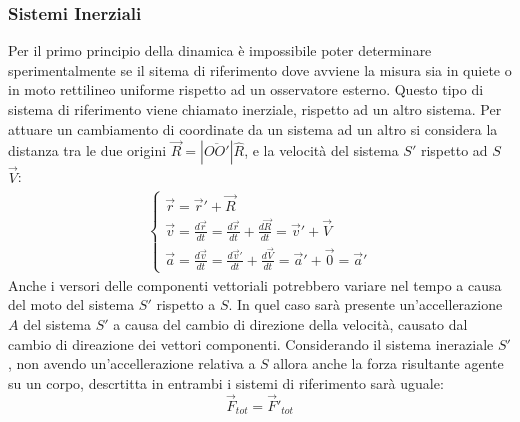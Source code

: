 \documentclass{article}
\numberwithin{equation}{subsection}
\begin{document}
\subsubsection{Sistemi Inerziali}
Per il primo principio della dinamica è impossibile poter 
determinare sperimentalmente se il sitema di riferimento dove 
avviene la misura sia in quiete o in moto rettilineo uniforme 
rispetto ad un osservatore esterno. 
Questo tipo di sistema di riferimento viene chiamato 
inerziale, rispetto ad un altro sistema. Per attuare un 
cambiamento di coordinate da un sistema ad un altro si 
considera la distanza tra le due origini 
$\vec{R}=\left|\overline{OO'}\right|\hat{R}$, e la velocità del 
sistema $S'$ rispetto ad $S$ $\vec{V}$:
\begin{gather}
    \begin{cases}
        \vec{r}=\vec{r}'+\vec{R}\\
        \vec{v}=\displaystyle\frac{d\vec{r}}{dt}=\frac{d\vec{r}}{dt}+\frac{d\vec{R}}{dt}=\vec{v}'+\vec{V}\\
        \vec{a}=\displaystyle\frac{d\vec{v}}{dt}=\frac{d\vec{v}'}{dt}+\frac{d\vec{V}}{dt}=\vec{a}'+\vec{0}=\vec{a}'
    \end{cases}
\end{gather}
Anche i versori delle componenti vettoriali potrebbero variare nel 
tempo a causa del moto del sistema $S'$ rispetto a $S$. In quel 
caso sarà presente un'accellerazione $A$ del sistema $S'$ a 
causa del cambio di direzione della velocità, causato dal cambio 
di direazione dei vettori componenti. Considerando il sistema 
ineraziale $S'$, non avendo un'accellerazione relativa a $S$ 
allora anche la forza risultante agente su un corpo, descrtitta 
in entrambi i sistemi di riferimento sarà uguale: 
\begin{equation}
    \vec{F}_{tot}=\vec{F}'_{tot}
\end{equation}

\begin{center}\end{center}
\end{document}
